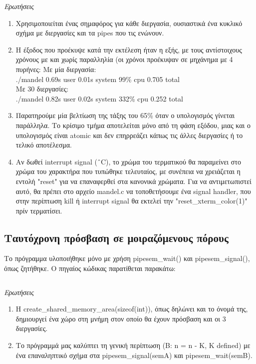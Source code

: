 \documentclass[a4paper,10pt]{article} \usepackage{anysize}
\begin{document}
\emph{Ερωτήσεις}
\begin{enumerate}
\item Χρησιμοποιείται ένας σημαφόρος για κάθε διεργασία, ουσιαστικά ένα κυκλικό σχήμα με διεργασίες και τα pipes που τις ενώνουν.
\item Η έξοδος που προέκυψε κατά την εκτέλεση ήταν η εξής, με τους αντίστοιχους χρόνους με και χωρίς παραλληλία (οι χρόνοι προέκυψαν σε μηχάνημα με 4 πυρήνες:
Mε μία διεργασία:\\
./mandel  0.69s user 0.01s system 99\% cpu 0.705 total\\
Με 30 διεργασίες:\\
./mandel  0.82s user 0.02s system 332\% cpu 0.252 total
\item Παρατηρούμε μία βελτίωση της τάξης του 65\% όταν ο υπολογισμός γίνεται παράλληλα. Το κρίσιμο τμήμα αποτελείται μόνο από τη φάση εξόδου,
μιας και ο υπολογισμός είναι atomic και δεν επηρρεάζει κάπως τις άλλες διεργασίες ή το τελικό αποτέλεσμα.
\item Αν δωθεί interrupt signal (\^\ C), το χρώμα του τερματικού θα παραμείνει στο χρώμα του χαρακτήρα που τυπώθηκε τελευταίος, με συνέπεια να χρειάζεται
η εντολή "reset" για να επαναφερθεί στα κανονικά χρώματα. Για να αντιμετωπιστεί αυτό, θα πρέπει στο αρχείο mandel.c να τοποθετήσουμε ένα signal handler, που στην περίπτωση kill ή interrupt signal θα εκτελεί την "reset\_xterm\_color(1)" πρίν τερματίσει.
\end{enumerate}

\subsection{Ταυτόχρονη πρόσβαση σε μοιραζόμενους πόρους} 
Το πρόγραμμα υλοποιήθηκε μόνο με χρήση pipesem\_wait() και pipesem\_signal(), όπως ζητήθηκε.
Ο πηγαίος κώδικας παρατίθεται παρακάτω:
\inputminted[linenos,fontsize=\footnotesize,frame=leftline]{c}{files/procs-shm.c}
\newpage

\emph{Ερωτήσεις}
\begin{enumerate}
\item Η create\_shared\_memory\_area(sizeof(int)), όπως δηλώνει και το όνομά της, δημιουργεί ένα χώρο στη μνήμη στον οποίο θα έχουν πρόσβαση και οι 3
διεργασίες.
\item Το πρόγραμμά μας καλύπτει τη γενική περίπτωση (Β: n = n - K,  K defined) με ένα επαναληπτικό σχήμα στα pipesem\_signal(semA) και 
pipesem\_wait(semB).
\end{enumerate}
\end{document}
